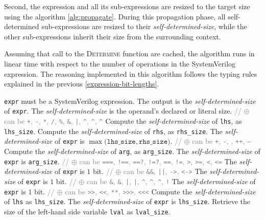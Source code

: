 \documentclass{article}
\newcommand{\tild}{\raisebox{-.7ex}{\textasciitilde{}}}
\newcommand{\sds}{\emph{self-determined-size}}
\newcommand{\binOp}{\texttt{+}, \texttt{-}, \texttt{*}, \texttt{/}, \texttt{\%},
\texttt{\&}, \texttt{|}, \texttt{\^{}}, \texttt{\^{}\tild},
\texttt{\tild\^{}}}
\newcommand{\unOp}{\texttt{+}, \texttt{-}, \texttt{\tild}, \texttt{++},
  \texttt{--}}
\newcommand{\shiftOp}{\texttt{>>}, \texttt{<}\texttt{<}, \texttt{**},
  \texttt{>>>}, \texttt{<}\texttt{<}\texttt{<}}
\newcommand{\compOp}{\texttt{===}, \texttt{!==}, \texttt{==?}, \texttt{!=?},
  \texttt{==}, \texttt{!=}, \texttt{>}, \texttt{>=}, \texttt{<}, \texttt{<=}}
\newcommand{\logicOp}{\texttt{\&\&}, \texttt{||}, \texttt{->}, \texttt{<->}}
\newcommand{\redOp}{\texttt{\&}, \texttt{\tild\&}, \texttt{|}, \texttt{\tild|},
\texttt{\^{}}, \texttt{\tild\^{}}, \texttt{\^{}\tild}, \texttt{!}}
\renewcommand{\Comment}[1]{\State \textcolor{gray}{// #1}}
\begin{document}
Second, the expression and all its sub-expressions are resized to the target
size using the algorithm \ref{alg:propagate}. During this
propagation phase, all self-determined sub-expressions are resized to their
\sds{}, while the other sub-expressions inherit their size from the surrounding
context.

Assuming that call to the \textsc{Determine} function are cached, the algorithm
runs in linear time with respect to the number of operations in
the SystemVerilog expression. The reasoning implemented in this algorithm
follows the typing rules explained in the previous
\autoref{expression-bit-lengths}.

\begin{algorithm}
  \caption{Compute the \sds{} of an expression.}
  \label{alg:determine}
  \begin{algorithmic}[1]
    \Require \texttt{expr} must be a SystemVerilog expression.
    \Ensure The output is the \sds{} of \texttt{expr}.
    \State The \sds{} is the operand's declared or literal size.
    \ENDWHEN
    \Comment{$\oplus$ can be \binOp{}}
    \State Compute the \sds{} of \texttt{lhs}, as \texttt{lhs\_size}.
    \State Compute the \sds{} of \texttt{rhs}, as \texttt{rhs\_size}.
    \State The \sds{} of \texttt{expr} is $\max\big(\texttt{lhs\_size}, \texttt{rhs\_size}\big)$.
    \ENDWHEN
    \Comment{$\oplus$ can be \unOp{}}
    \State Compute the \sds{} of \texttt{arg}, as \texttt{arg\_size}.
    \State The \sds{} of \texttt{expr} is \texttt{arg\_size}.
    \ENDWHEN
    \Comment{$\oplus$ can be \compOp{}}
    \State The \sds{} of \texttt{expr} is $1$ bit.
    \ENDWHEN
    \Comment{$\oplus$ can be \logicOp{}}
    \State The \sds{} of \texttt{expr} is $1$ bit.
    \ENDWHEN
    \Comment{$\oplus$ can be \redOp{}}
    \State The \sds{} of \texttt{expr} is $1$ bit.
    \ENDWHEN
    \Comment{$\oplus$ can be \shiftOp{}}
    \State Compute the \sds{} of \texttt{lhs} as \texttt{lhs\_size}.
    \State The \sds{} of \texttt{expr} is \texttt{lhs\_size}.
    \ENDWHEN
    \State Retrieve the size of the left-hand side variable \texttt{lval} as \texttt{lval\_size}.

\end{algorithmic}
\end{algorithm}
\end{document}
